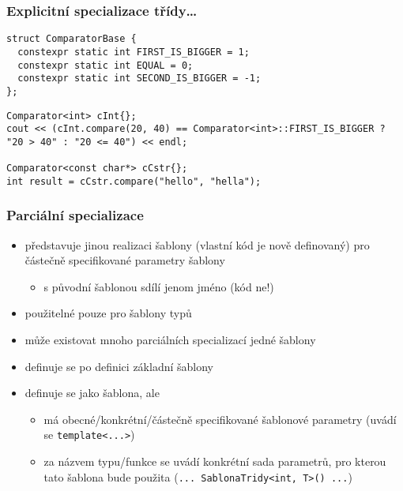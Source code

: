 \begin{frame}[fragile]
\frametitle{Explicitní specializace třídy\ldots}
\begin{yesblock}
\begin{lstlisting}[basicstyle=\small]
struct ComparatorBase {
  constexpr static int FIRST_IS_BIGGER = 1;
  constexpr static int EQUAL = 0;
  constexpr static int SECOND_IS_BIGGER = -1;
};
\end{lstlisting}
\end{yesblock}

\begin{yesblock}
\begin{lstlisting}[basicstyle=\small]
Comparator<int> cInt{};
cout << (cInt.compare(20, 40) == Comparator<int>::FIRST_IS_BIGGER ? "20 > 40" : "20 <= 40") << endl;

Comparator<const char*> cCstr{};
int result = cCstr.compare("hello", "hella");
\end{lstlisting}
\end{yesblock}
\end{frame}
















\begin{frame}[fragile]
\frametitle{Parciální specializace}
\begin{block}{}
\begin{itemize}
\item představuje jinou realizaci šablony (vlastní kód je nově definovaný) pro částečně specifikované parametry šablony
\begin{itemize}
\item s původní šablonou sdílí jenom jméno (kód ne!)
\end{itemize}
\item použitelné pouze pro šablony typů
\item může existovat mnoho parciálních specializací jedné šablony
\end{itemize}
\end{block}

\begin{noteblock}{}
\begin{itemize}
\item definuje se po definici základní šablony
\item definuje se jako šablona, ale
\begin{itemize}
\item má obecné/konkrétní/částečně specifikované šablonové parametry (uvádí se \lstinline|template<...>|)
\item za názvem typu/funkce se uvádí konkrétní sada parametrů, pro kterou tato šablona bude použita (\lstinline|... SablonaTridy<int, T>() ...|)
\end{itemize}
\end{itemize}
\end{noteblock}
\end{frame}



